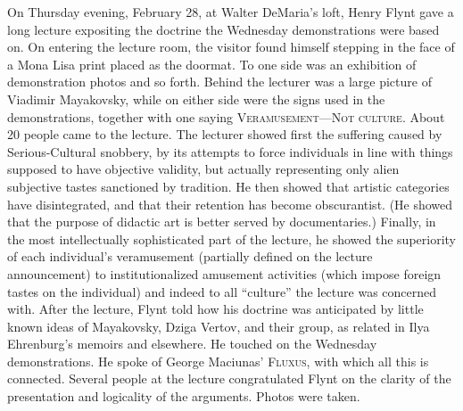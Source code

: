 On Thursday evening, February 28, at Walter DeMaria's loft, Henry Flynt 
gave a long lecture expositing the doctrine the Wednesday demonstrations 
were based on. On entering the lecture room, the visitor found himself 
stepping in the face of a Mona Lisa print placed as the doormat. To one side 
was an exhibition of demonstration photos and so forth. Behind the lecturer 
was a large picture of Viadimir Mayakovsky, while on either side were the 
signs used in the demonstrations, together with one saying 
\textsc{Veramusement---Not culture}. About 20 people came to the lecture. 
The lecturer showed first the suffering caused by Serious-Cultural snobbery, 
by its attempts to force individuals in line with things supposed to have 
objective validity, but actually representing only alien subjective tastes 
sanctioned by tradition. He then showed that artistic categories have 
disintegrated, and that their retention has become obscurantist. (He showed 
that the purpose of didactic art is better served by documentaries.) Finally, 
in the most intellectually sophisticated part of the lecture, he showed the 
superiority of each individual's veramusement (partially defined on the 
lecture announcement) to institutionalized amusement activities (which 
impose foreign tastes on the individual) and indeed to all \enquote{culture} the 
lecture was concerned with. After the lecture, Flynt told how his doctrine 
was anticipated by little known ideas of Mayakovsky, Dziga Vertov, and 
their group, as related in Ilya Ehrenburg's memoirs and elsewhere. He 
touched on the Wednesday demonstrations. He spoke of George Maciunas' 
\textsc{Fluxus}, with which all this is connected. Several people at the lecture 
congratulated Flynt on the clarity of the presentation and logicality of the 
arguments. Photos were taken. 

